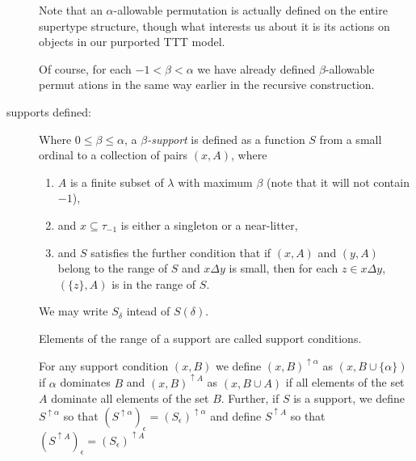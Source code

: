 \documentclass[112pt]{article}
\begin{document}
\begin{description}
Note that an $\alpha$-allowable permutation is actually defined on the entire supertype structure, though what interests us about it is its actions on objects in our purported TTT model.

Of course, for each $-1<\beta<\alpha$ we have already defined $\beta$-allowable permut
ations in the same way earlier in the recursive construction.

\item[supports defined:]  Where $0\leq\beta \leq \alpha$, a {\em $\beta$-support\/} is defined as a function $S$ from a small ordinal to a collection of pairs $(x,A)$, where 
\begin{enumerate}

\item $A$ is a finite subset of $\lambda$  with maximum $\beta$ (note that it will not contain $-1$), 

\item and $x\subseteq \tau_{-1}$ is either a singleton or a near-litter,

\item  and $S$ satisfies the further condition
that if $(x,A)$ and $(y,A)$ belong to the range of $S$ and $x \Delta y$ is small, then for each $z \in x \Delta y$, $(\{z\},A)$ is in the range of $S$. 

\end{enumerate}

   We may write $S_\delta$ intead of $S(\delta)$.

Elements of the range of a support are called support conditions.

For any support condition $(x,B)$ we define $(x,B)^{\uparrow \alpha}$ as $(x,B\cup \{\alpha\})$ if $\alpha$ dominates $B$ and $(x,B)^{\uparrow A}$ as $(x,B\cup A)$ if all elements of the set $A$ dominate all elements of the set $B$.
Further, if $S$ is a support, we define $S^{\uparrow \alpha}$ so that $(S^{\uparrow \alpha})_\epsilon = (S_\epsilon)^{\uparrow \alpha}$ and define $S^{\uparrow A}$ so that $(S^{\uparrow A})_\epsilon = (S_\epsilon)^{\uparrow A}$

\begin{comment}

We make the formal requirement on supports
that if the range of a support contains $(x,A)$ and $(y,A)$ where $x,y$ are typed near-litters and either $(x \Delta y)\cap \tau_{-1}$ or $(x \cap y) \cap \tau_{-1}$ is small, that all $(z,A)$ with $z\cap \tau_{-1}$ a singleton subset of this small set are included in the range of the support.


\end{comment}
\end{description}
\end{document}
